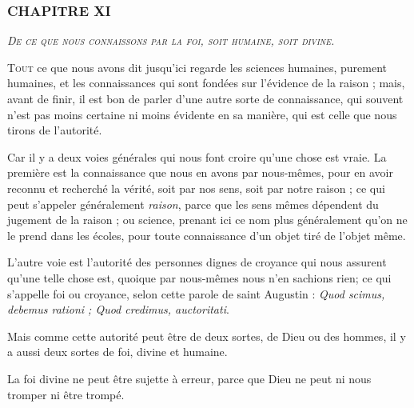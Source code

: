 \subsubsection{\centering \Large CHAPITRE XI}
\begin{center}\emph{\large\scshape De ce que nous connaissons par la foi, soit humaine, soit divine.}\end{center}


	\lettrine{T}{out} ce que nous avons dit jusqu'ici regarde les sciences humaines, purement humaines, et les connaissances qui sont fondées sur l'évidence de la raison ; mais, avant de finir, il est bon de parler d'une autre sorte de connaissance, qui souvent n'est pas moins certaine ni moins évidente en sa manière, qui est celle que nous tirons de l'autorité.

Car il y a deux voies générales qui nous font croire qu'une chose est vraie. La première est la connaissance que nous en avons par nous-mêmes, pour en avoir reconnu et recherché la vérité, soit par nos sens, soit par notre raison ; ce qui peut s'appeler généralement \emph{raison}, parce que les sens mêmes dépendent du jugement de la raison ; ou science, prenant ici ce nom plus généralement qu'on ne le prend dans les écoles, pour toute connaissance d'un objet tiré de l'objet même.

L'autre voie est l'autorité des personnes dignes de croyance qui nous assurent qu'une telle chose est, quoique par nous-mêmes nous n'en sachions rien; ce qui s'appelle foi ou croyance, selon cette parole de saint Augustin : \emph{Quod scimus, debemus rationi ; Quod credimus, auctoritati}.

Mais comme cette autorité peut être de deux sortes, de Dieu ou des hommes, il y a aussi deux sortes de foi, divine et humaine.

La foi divine ne peut être sujette à erreur, parce que Dieu ne peut ni nous tromper ni être trompé.

